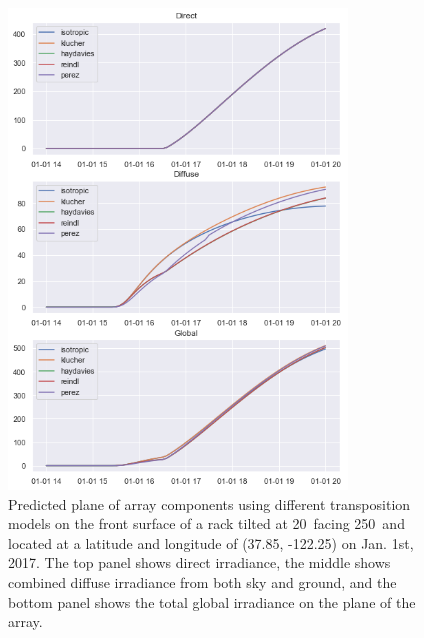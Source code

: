 \documentclass[conference]{IEEEtran}
\begin{document}
\begin{figure}
\centering
\includegraphics[width=9cm]{frontside_transposition.png}
\caption{Predicted plane of array components using different transposition models on the front surface of a rack tilted at 20\degree\ facing 250\degree\ and located at a latitude and longitude of (37.85\degree, -122.25\degree) on Jan. 1st, 2017.  The top panel shows direct irradiance, the middle shows combined diffuse irradiance from both sky and ground, and the bottom panel shows the total global irradiance on the plane of the array.}
\label{fig:frontside-transposition}
\end{figure}
\end{document}
